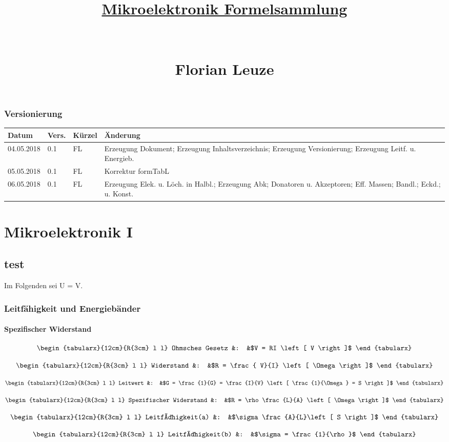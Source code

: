\documentclass[12pt,a4paper]{report}%
\numberwithin{equation}{section}
\def\bracks#1{\left[ #1 \right]}
\newcommand{\formTabL}[3]{
\begin{equation}
  \begin{tabularx}{12cm}{R{3cm} l l}
    #1 &: &$#2$ 
  \end{tabularx}
  \label{eq:#3}
\end{equation}}
\begin{document}


\author{}
\title{\underline{Mikroelektronik Formelsammlung} \\ $\;$ \\ $\;$ \\ Florian Leuze}
\date{}

\maketitle %
\newpage
\tableofcontents

  \subsection{Versionierung}
  \begin{tabular}{|p{2cm}|p{1cm}|p{1.5cm}|p{8.5cm}|}\hline
    Datum & Vers. & Kürzel & Änderung \\ \hline
    04.05.2018 & 0.1 & FL & Erzeugung Dokument; Erzeugung Inhaltsverzeichnis; Erzeugung Versionierung; Erzeugung Leitf. u. Energieb.\\ \hline
    05.05.2018 & 0.1 & FL & Korrektur formTabL \\ \hline
    06.05.2018 & 0.1 & FL & Erzeugung Elek. u. Löch. in Halbl.; Erzeugung Abk; Donatoren u. Akzeptoren; Eff. Massen; Bandl.; Eckd.; u. Konst. \\ \hline
  \end{tabular}
\newpage
\chapter{Mikroelektronik I}
\section{test}
Im Folgenden sei U = V.
  \subsection{Leitfähigkeit und Energiebänder}
  \subsubsection{Spezifischer Widerstand}
  \formTabL{Ohmsches Gesetz}{V = RI \bracks{V}}{ohms_law_V}
  \formTabL{Widerstand}{R = \frac{ V}{I} \bracks{\Omega}}{ohms_law_R}
  \formTabL{Leitwert}{G = \frac{1}{G} = \frac{I}{V} \bracks{\frac{1}{\Omega} = S}}{leitwert}
  \formTabL{Spezifischer Widerstand}{R = \rho \frac{L}{A} \bracks{\Omega}}{spezR}
  \formTabL{Leitfähigkeit(a)}{\sigma \frac{A}{L}\bracks{S}}{leitf_a}
  \formTabL{Leitfähigkeit(b)}{\sigma = \frac{1}{\rho}}{leitf_b}
  
\end{document}
